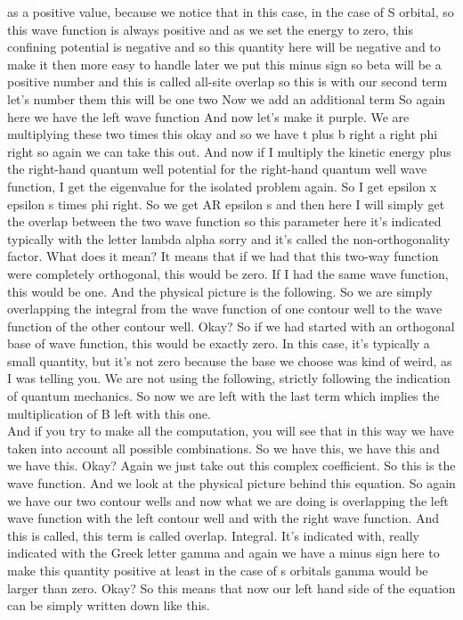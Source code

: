 as a positive value, because we notice that in this case, in the case of S orbital, so this wave function is always positive and as we set the energy to zero, this confining potential is negative and so this quantity here will be negative and to make it then more easy to handle later we put this minus sign so beta will be a positive number and this is called all-site overlap so this is with our second term let's number them this will be one two Now we add an additional term So again here we have the left wave function And now let's make it purple. We are multiplying these two times this okay and so we have t plus b right a right phi right so again we can take this out.
And now if I multiply the kinetic energy plus the right-hand quantum well potential for the right-hand quantum well wave function, I get the eigenvalue for the isolated problem again. So I get epsilon x epsilon s times phi right. So we get AR epsilon s and then here I will simply get the overlap between the two wave function so this parameter here it's indicated typically with the letter lambda alpha sorry and it's called the non-orthogonality factor. What does it mean? It means that if we had that this two-way function were completely orthogonal, this would be zero. If I had the same wave function, this would be one. And the physical picture is the following. So we are simply overlapping the integral from the wave function of one contour well to the wave function of the other contour well. Okay? So if we had started with an orthogonal base of wave function, this would be exactly zero. In this case, it's typically a small quantity, but it's not zero because the base we choose was kind of weird, as I was telling you. We are not using the following, strictly following the indication of quantum mechanics. So now we are left with the last term which implies the multiplication of B left with this one.\\
And if you try to make all the computation, you will see that in this way we have taken into account all possible combinations. So we have this, we have this and we have this. Okay? Again we just take out this complex coefficient. So this is the wave function. And we look at the physical picture behind this equation. So again we have our two contour wells and now what we are doing is overlapping the left wave function with the left contour well and with the right wave function. And this is called, this term is called overlap. Integral. It's indicated with, really indicated with the Greek letter gamma and again we have a minus sign here to make this quantity positive at least in the case of s orbitals gamma would be larger than zero. Okay? So this means that now our left hand side of the equation can be simply written down like this.
